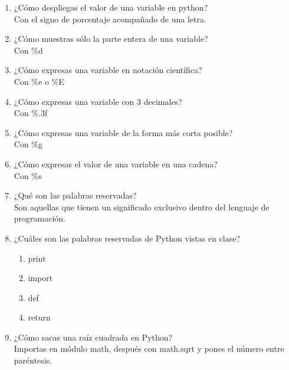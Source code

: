\documentclass[letterpaper, 12pt, oneside]{article} %
\begin{document}
\begin{enumerate}
		\item ¿Cómo despliegas el valor de una variable en python?\\Con el signo de porcentaje acompañado de una letra.
		\item ¿Cómo muestras sólo la parte entera de una variable?\\Con $\%$d
		\item ¿Cómo expresas una variable en notación científica?\\Con $\%$e o $\%$E
		\item ¿Cómo expresas una variable con 3 decimales?\\Con $\%$.3f
		\item ¿Cómo expresas una variable de la forma más corta posible?\\Con $\%$g
		\item ¿Cómo expresas el valor de una variable en una cadena?\\Con $\%$s
		\item ¿Qué son las palabras reservadas?\\Son aquellas que tienen un significado exclusivo dentro del lenguaje de programación.
		\item ¿Cuáles son las palabras reservadas de Python vistas en clase?
		\begin{enumerate}
			\item print
			\item import
			\item def
			\item return
		\end{enumerate}
		\item ¿Cómo sacas una raíz cuadrada en Python?\\Importas en módulo math, después con math.sqrt y pones el número entre paréntesis.
	\end{enumerate}
\end{document}
